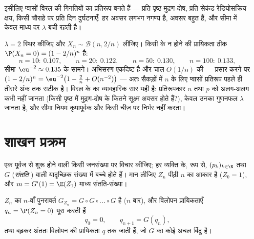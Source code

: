 \begin{remark}
इसीलिए प्वासों  विरल  की गिनतियों का प्रतिरूप बनते हैं ---
प्रति पृष्ठ मुद्रण-दोष, प्रति सेकंड रेडियोसक्रिय क्षय, किसी चौराहे
पर प्रति दिन दुर्घटनाएँ: हर अवसर लगभग नगण्य है, अवसर बहुत हैं, और
सीमा में केवल माध्य दर $\lambda$ बची रहती है।
\end{remark}

\begin{example}[प्वासों सीमा को अभिसरित होते
देखना]\label{ex:b2:genfun:poissonnumerics}
$\lambda = 2$ स्थिर कीजिए और $X_n \sim \mathcal B(n, 2/n)$ लीजिए। किसी  के न होने की प्रायिकता ठीक
$\P(X_n = 0) = (1 - 2/n)^n$ है:
\[
n = 10:\ 0.107, \qquad
n = 20:\ 0.122, \qquad
n = 50:\ 0.130, \qquad
n = 100:\ 0.133,
\]
सीमा $\eu^{-2} \approx 0.135$ के सामने। अभिसरण एकदिष्ट है और चाल $O(1/n)$ की --- प्रसार करने
पर $(1 -
2/n)^n = \eu^{-2}\bigl(1 - \tfrac2n + O(n^{-2})\bigr)$ --- अतः सैकड़ों में $n$ के लिए प्वासों प्रतिरूप पहले ही तीसरे
अंक तक सटीक है। विरल  के  का व्यावहारिक सार यही है:
प्रतिरूपकार $n$ तथा $p$ को अलग-अलग कभी नहीं जानता (किसी पृष्ठ में
मुद्रण-दोष के कितने सूक्ष्म अवसर होते हैं?), केवल उनका गुणनफल $\lambda$
जानता है, और सीमा नियम कृपापूर्वक और किसी चीज़ पर निर्भर नहीं करता।
\end{example}

\section{शाखन प्रक्रम}

एक पूर्वज से शुरू होने वाली किसी जनसंख्या पर विचार कीजिए; हर
व्यक्ति के,  रूप से,  $(p_k)_{k
\in \N}$ तथा  $G$
(\emph{संतति }) वाली यादृच्छिक संख्या में बच्चे होते हैं। मान
लीजिए $Z_n$ पीढ़ी $n$ का आकार है ($Z_0 =
1$), और $m = G'(1) = \E(Z_1)$ माध्य संतति-संख्या।

\begin{proposition}\label{prop:b2:genfun:branching}
$Z_n$ का  $n$-वाँ पुनरावर्त $G_{Z_n} = G \circ G \circ \dots \circ G$ है ($n$ बार), और विलोपन
प्रायिकताएँ $q_n = \P(Z_n = 0)$ पूरा करती हैं
\[
q_0 = 0, \qquad q_{n+1} = G(q_n),
\]
तथा बढ़कर अंततः विलोपन की प्रायिकता $q$ तक जाती हैं, जो $G$ का कोई
अचल बिंदु है।
\end{proposition}

